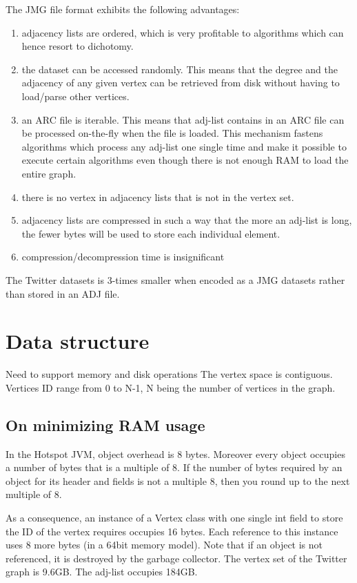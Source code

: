 \documentclass[11pt,a4paper]{article}
\begin{document}
The JMG file format exhibits the following advantages:
\begin{enumerate}
\item adjacency lists are ordered, which is very profitable to algorithms which can hence resort to dichotomy.
\item the dataset can be accessed randomly. This means that the degree and the adjacency of any given vertex can be retrieved from disk without having to load/parse other vertices.
\item an ARC file is iterable. This means that adj-list contains in an ARC file can be processed on-the-fly when the file is loaded. This mechanism fastens algorithms which process any adj-list one single time and make it possible to execute certain algorithms even though there is not enough RAM to load the entire graph.
\item there is no vertex in adjacency lists that is not in the vertex set.
\item adjacency lists are compressed in such a way that the more an adj-list is long, the fewer bytes will be used to store each individual element.
\item compression/decompression time is insignificant
\end{enumerate}

The Twitter datasets is 3-times smaller when encoded as a JMG datasets rather than stored in an ADJ file.

\section{Data structure}

Need to support memory and disk operations
The vertex space is contiguous. Vertices ID range from 0 to N-1, N being the number of vertices in the graph.


\subsection{On minimizing RAM usage}

In the Hotspot JVM, object overhead is 8 bytes. Moreover every object occupies a number of bytes that is a multiple of 8. If the number of bytes required by an object for its header and fields is not a multiple 8, then you round up to the next multiple of 8.  

As a consequence, an instance of a Vertex class with one single int field to store the ID of the vertex requires occupies 16 bytes. Each reference to this instance uses 8 more bytes (in a 64bit memory model). Note that if an object is not referenced, it is destroyed by the garbage collector. The vertex set of the Twitter graph is 9.6GB. The adj-list occupies 184GB.
\end{document}
